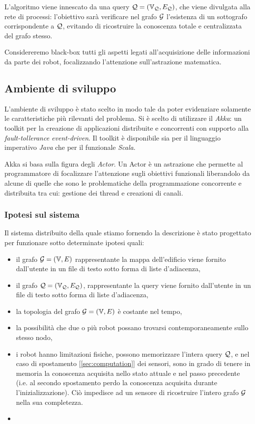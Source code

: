 \documentclass{llncs}
\begin{document}
L'algoritmo viene innescato da una query $\mathcal{Q} = (\mathbb{V}_{\mathcal{Q}}, E_{\mathcal{Q}})$, 
che viene divulgata alla rete di processi: l'obiettivo sarà verificare
nel grafo $\mathcal{G}$ l'esistenza di un sottografo corrispondente a $\mathcal{Q}$,
evitando di ricostruire la conoscenza totale e centralizzata del
grafo stesso.

Considereremo black-box tutti gli aspetti legati all'acquisizione delle informazioni
da parte dei robot, focalizzando l'attenzione sull'astrazione matematica.



\subsection{Ambiente di sviluppo}
L'ambiente di sviluppo è stato scelto in modo tale da poter evidenziare solamente
le caratteristiche più rilevanti del problema.
Si è scelto di utilizzare il \emph{Akka}: un toolkit per la creazione di applicazioni
distribuite e concorrenti con supporto alla \emph{fault-tollerance event-driven}.
Il toolkit è disponibile sia per il linguaggio imperativo \emph{Java} che per il
funzionale \emph{Scala}.

Akka si basa sulla figura degli \emph{Actor}. Un Actor è un astrazione che permette
al programmatore di focalizzare l'attenzione sugli obiettivi funzionali liberandolo
da alcune di quelle che sono le  problematiche della programmazione
concorrente e distribuita tra cui: gestione dei thread e creazioni di canali.
\subsubsection{Ipotesi sul sistema}
\label{sec:hypotesis}
Il sistema distribuito della quale stiamo fornendo la descrizione è stato progettato per funzionare
sotto determinate ipotesi quali:
\begin{itemize}
	\item il grafo $\mathcal{G} = ( \mathbb{V}, E)$ rappresentante la mappa dell'edificio viene fornito dall'utente in un
	file di testo sotto forma di liste d'adiacenza,
	\item il grafo  $\mathcal{Q} = (\mathbb{V}_{\mathcal{Q}}, E_{\mathcal{Q}})$,  rappresentante la query viene fornito dall'utente in un
	file di testo sotto forma di liste d'adiacenza,
	\item la topologia del grafo $\mathcal{G} = ( \mathbb{V}, E)$ è costante nel tempo,
	\item la possibilità che due o più robot possano trovarsi contemporaneamente sullo stesso nodo,
	\item i robot hanno limitazioni fisiche, possono memorizzare l'intera  query $\mathcal{Q}$, e
	nel caso di spostamento [\ref{sec:computation}] dei sensori, sono in grado di tenere in memoria la conoscenza acquisita nello stato attuale e nel passo precedente (i.e. al secondo spostamento perdo la conoscenza acquisita
	durante l'inizializzazione). Ciò impedisce ad un sensore di ricostruire l'intero grafo $\mathcal{G}$ nella sua completezza.
	\item {}
\end{itemize}
\end{document}
